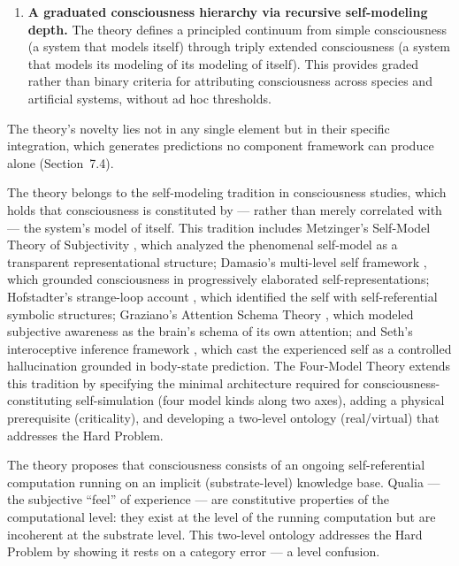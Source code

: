 \documentclass[12pt]{article}
\newcommand{\revstart}{}
\newcommand{\revend}{}
\begin{document}
\begin{enumerate}
\item \textbf{A graduated consciousness hierarchy via recursive self-modeling depth.} The theory defines a principled continuum from simple consciousness (a system that models itself) through triply extended consciousness (a system that models its modeling of its modeling of itself). This provides graded rather than binary criteria for attributing consciousness across species and artificial systems, without ad hoc thresholds.
\end{enumerate}

{\revstart The theory's novelty lies not in any single element but in their specific integration, which generates predictions no component framework can produce alone (Section~7.4).\revend}

The theory belongs to the self-modeling tradition in consciousness studies, which holds that consciousness is constituted by --- rather than merely correlated with --- the system's model of itself. This tradition includes Metzinger's Self-Model Theory of Subjectivity \citep{Metzinger2003,Metzinger2009}, which analyzed the phenomenal self-model as a transparent representational structure; Damasio's multi-level self framework \citep{Damasio1999,Damasio2010}, which grounded consciousness in progressively elaborated self-representations; Hofstadter's strange-loop account \citep{Hofstadter2007}, which identified the self with self-referential symbolic structures; Graziano's Attention Schema Theory \citep{Graziano2013}, which modeled subjective awareness as the brain's schema of its own attention; and Seth's interoceptive inference framework \citep{Seth2021,SethBayne2022}, which cast the experienced self as a controlled hallucination grounded in body-state prediction. The Four-Model Theory extends this tradition by specifying the minimal architecture required for consciousness-constituting self-simulation (four model kinds along two axes), adding a physical prerequisite (criticality), and developing a two-level ontology (real/virtual) that addresses the Hard Problem.

The theory proposes that consciousness consists of an ongoing self-referential computation running on an implicit (substrate-level) knowledge base. Qualia --- the subjective ``feel'' of experience --- are constitutive properties of the computational level: they exist at the level of the running computation but are incoherent at the substrate level. This two-level ontology addresses the Hard Problem by showing it rests on a category error --- a level confusion.
\end{document}
